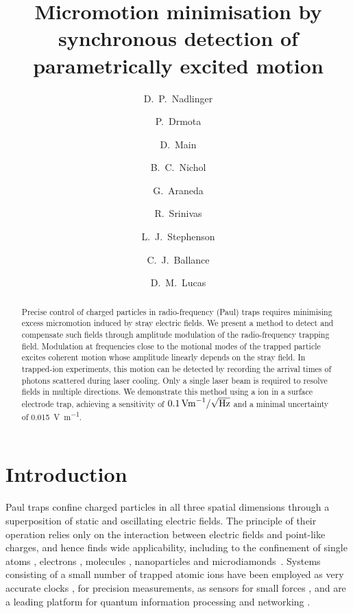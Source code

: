 \documentclass[pra,twocolumn]{revtex4-2}
\begin{document}
\title{Micromotion minimisation by synchronous detection of parametrically excited motion}

\author{D.~P.~Nadlinger}
\author{P.~Drmota}
\author{D.~Main}
\author{B.~C.~Nichol}
\author{G.~Araneda}
\author{R.~Srinivas}
\author{L.~J.~Stephenson}
\author{C.~J.~Ballance}
\author{D.~M.~Lucas}

\begin{abstract}
	Precise control of charged particles in radio-frequency (Paul) traps requires minimising excess micromotion induced by stray electric fields.
	We present a method to detect and compensate such fields through amplitude modulation of the radio-frequency trapping field.
	Modulation at frequencies close to the motional modes of the trapped particle excites coherent motion whose amplitude linearly depends on the stray field.
	In trapped-ion experiments, this motion can be detected by recording the arrival times of photons scattered during laser cooling.
	Only a single laser beam is required to resolve fields in multiple directions.
	We demonstrate this method using a \srplus{} ion in a surface electrode trap, achieving a sensitivity of $\SI{0.1}{V m^{-1} / \sqrt{\hertz}}$ and a minimal uncertainty of \SI{0.015}{\volt \metre^{-1}}.
\end{abstract}

\maketitle

\section{Introduction}

Paul traps confine charged particles in all three spatial dimensions through a superposition of static and oscillating electric fields.
The principle of their operation relies only on the interaction between electric fields and point-like charges, and hence finds wide applicability, including to the confinement of single atoms \cite{Leibfried2003}, electrons \cite{matthiesenTrappingElectronsRoomTemperature2021}, molecules \cite{lohPrecisionSpectroscopyPolarized2013}, nanoparticles \cite{aldaTrappingManipulationIndividual2016} and microdiamonds~\cite{delordSpincoolingMotionTrapped2020}.
Systems consisting of a small number of trapped atomic ions have been employed as very accurate clocks \cite{brewerQuantumLogicClockSystematic2019}, for precision measurements, as sensors for small forces \cite{blumsSingleatom3DSubattonewton2018}, and are a leading platform for quantum information processing \cite{haffnerQuantumComputingTrapped2008} and networking \cite{moehringEntanglementSingleatomQuantum2007}.
\end{document}
